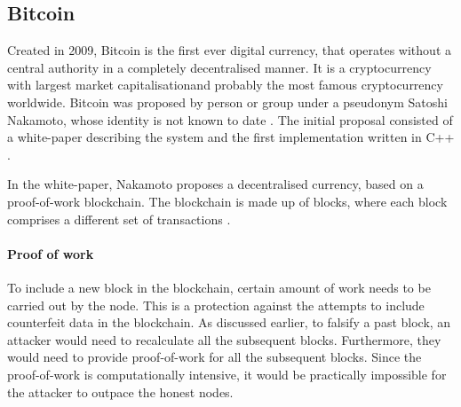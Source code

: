 \subsection{Bitcoin}
% 
Created in 2009, Bitcoin is the first ever digital currency, that operates without a central authority in a completely decentralised manner. It is a cryptocurrency with largest market capitalisation\footnotemark and probably the most famous cryptocurrency worldwide.
% 
% 
Bitcoin was proposed by person or group under a pseudonym Satoshi Nakamoto, whose identity is not known to date \cite{Feins2017SatoshiBitcoin}. The initial proposal consisted of a white-paper describing the system \cite{NakamotoBitcoin:System} and the first implementation written in  C++ \footnotemark.
% 

In the white-paper, Nakamoto proposes a decentralised currency, based on a proof-of-work blockchain. The blockchain is made up of blocks, where each block comprises a different set of transactions \cite{Decker2013InformationNetwork, Judmayer2017BlocksMechanisms}.

\paragraph{Proof of work}
To include a new block in the blockchain, certain amount of work needs to be carried out by the node. This is a protection against the attempts to include counterfeit data in the blockchain. As discussed earlier, to falsify a past block, an attacker would need to recalculate all the subsequent blocks. Furthermore, they would need to provide proof-of-work for all the subsequent blocks. Since the proof-of-work is computationally intensive, it would be practically impossible for the attacker to outpace the honest nodes.


